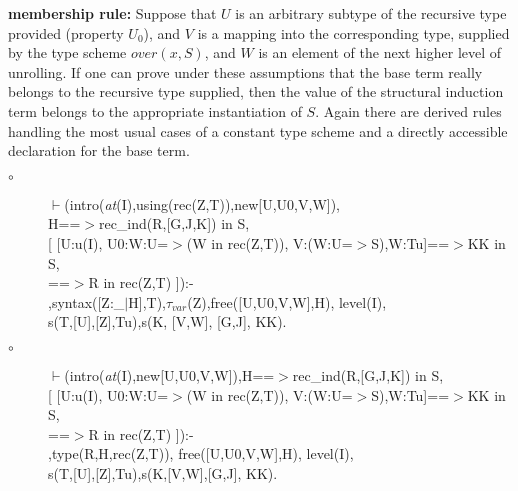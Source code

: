 \documentclass[11pt]{report}
\begin{document}
\begin{enumerate}
 {\bf membership rule:}
 Suppose that $U$ is an arbitrary subtype of the recursive type
 provided (property $U_0$), and $V$ is a mapping into the
 corresponding type, supplied by the type scheme $over(x,S)$,
 and $W$ is an element of the next higher level of unrolling.
 If one can prove under these assumptions that the base term
 really belongs to the recursive type supplied, then 
 the value of the structural induction term belongs to the appropriate
 instantiation of $S$.
 Again there are derived rules handling the most usual cases of
 a constant type scheme and a directly accessible declaration 
 for the base term.
 \begin{description}
 \item[$\circ$]
\begin{sf}\begin{tabbing}
$\vdash$(intro(\mbox{\it at}(I),using(rec(Z,T)),new[U,U0,V,W]),\\[-0.15ex]
\hspace{2em}H==$>$rec\_\hspace{0.1em}ind(R,[G,J,K]) in S,\\[-0.15ex]
\hspace{2em}[ [U:u(I), U0:W:U=$>$(W in rec(Z,T)), V:(W:U=$>$S),W:Tu]==$>$KK in S, \\[-0.15ex]
\hspace{3em}==$>$R in rec(Z,T) ]):-\\[-0.15ex]
\hspace{2em}{\bf derived},syntax([Z:\_\hspace{0.1em}$\mid$H],T),$\tau_{var}$(Z),free([U,U0,V,W],H), level(I),\\[-0.15ex]
\hspace{2em}s(T,[U],[Z],Tu),s(K, [V,W], [G,J], KK).
\end{tabbing}\end{sf}

 \item[$\circ$]
\begin{sf}\begin{tabbing}
$\vdash$(intro(\mbox{\it at}(I),new[U,U0,V,W]),H==$>$rec\_\hspace{0.1em}ind(R,[G,J,K]) in S,\\[-0.15ex]
\hspace{2em}[ [U:u(I), U0:W:U=$>$(W in rec(Z,T)), V:(W:U=$>$S),W:Tu]==$>$KK in S,\\[-0.15ex]
\hspace{3em}==$>$R in rec(Z,T) ]):-\\[-0.15ex]
\hspace{2em}{\bf derived},type(R,H,rec(Z,T)), free([U,U0,V,W],H), level(I),\\[-0.15ex]
\hspace{2em}s(T,[U],[Z],Tu),s(K,[V,W],[G,J], KK).
\end{tabbing}\end{sf}

 \end{description}%
 \end{enumerate}
  
\end{document}
